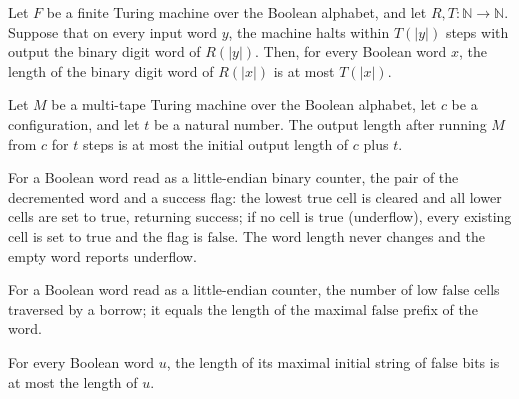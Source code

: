 \begin{lemma}
\label{Turing.FinTM.loop_fuel_width}
\leanok
{}
Let $F$ be a finite Turing machine over the Boolean alphabet, and let
$R,T:\mathbb{N}\to\mathbb{N}$. Suppose that on every input word $y$, the machine halts
within $T(|y|)$ steps with output the binary digit word of $R(|y|)$. Then, for every
Boolean word $x$, the length of the binary digit word of $R(|x|)$ is at most $T(|x|)$.
\end{lemma}

\begin{lemma}
\label{Turing.FinTM.loop_output_length_le}
\leanok
{}
Let $M$ be a multi-tape Turing machine over the Boolean alphabet, let $c$ be a
configuration, and let $t$ be a natural number. The output length after running $M$ from
$c$ for $t$ steps is at most the initial output length of $c$ plus $t$.
\end{lemma}

\begin{definition}
\label{Turing.FinTM.loopDebit}
\leanok
For a Boolean word read as a little-endian binary counter, the pair of the decremented
word and a success flag: the lowest $\mathrm{true}$ cell is cleared and all lower cells
are set to $\mathrm{true}$, returning success; if no cell is $\mathrm{true}$
(underflow), every existing cell is set to $\mathrm{true}$ and the flag is
$\mathrm{false}$. The word length never changes and the empty word reports underflow.
\end{definition}

\begin{definition}
\label{Turing.FinTM.loopBorrowPos}
\leanok
For a Boolean word read as a little-endian counter, the number of low $\mathrm{false}$
cells traversed by a borrow; it equals the length of the maximal $\mathrm{false}$ prefix
of the word.
\end{definition}

\begin{lemma}
\label{Turing.FinTM.loopBorrowPos_le}
\leanok
{}
For every Boolean word $u$, the length of its maximal initial string of false bits is at
most the length of $u$.
\end{lemma}

